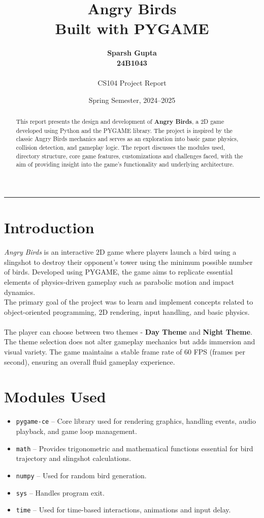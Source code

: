 \documentclass[10pt]{article}
\title{\Huge \textbf{Angry Birds} \\ \Large Built with PYGAME}
\author{\textbf{Sparsh Gupta} \\ \textbf{24B1043} \\ \\ CS104 Project Report}
\date{Spring Semester, 2024--2025}
\begin{document}
\maketitle
\vspace{-1em}
\hrule
\vspace{1em}

\begin{abstract}
This report presents the design and development of \textbf{Angry Birds}, a 2D game developed using Python and the PYGAME library. The project is inspired by the classic Angry Birds mechanics and serves as an exploration into basic game physics, collision detection, and gameplay logic. The report discusses the modules used, directory structure, core game features, customizations and challenges faced, with the aim of providing insight into the game's functionality and underlying architecture.
\end{abstract}

\tableofcontents
\newpage

\section{Introduction}
\label{sec:intro}
\textit{Angry Birds} is an interactive 2D game where players launch a bird using a slingshot to destroy their opponent's tower using the minimum possible number of birds. Developed using PYGAME, the game aims to replicate essential elements of physics-driven gameplay such as parabolic motion and impact dynamics.\\
The primary goal of the project was to learn and implement concepts related to object-oriented programming, 2D rendering, input handling, and basic physics. \\ \\
The player can choose between two themes - \textbf{Day Theme} and \textbf{Night Theme}. The theme selection does not alter gameplay mechanics but adds immersion and visual variety.
The game maintains a stable frame rate of 60 FPS (frames per second), ensuring an overall fluid gameplay experience.

\section{Modules Used}
\begin{itemize}
    \item \texttt{pygame-ce} – Core library used for rendering graphics, handling events, audio playback, and game loop management.
    \item \texttt{math} – Provides trigonometric and mathematical functions essential for bird trajectory and slingshot calculations.
    \item \texttt{numpy} – Used for random bird generation.
    \item \texttt{sys} – Handles program exit.
    \item \texttt{time} – Used for time-based interactions, animations and input delay.
\end{itemize}
\end{document}
